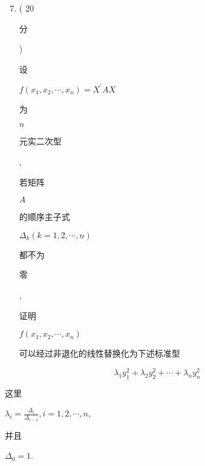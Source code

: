 \documentclass[10pt]{article}
\begin{document}
\begin{enumerate}
  \setcounter{enumi}{6}
  \item ( 20 \begin{CJK}{UTF8}{mj}分\end{CJK}) \begin{CJK}{UTF8}{mj}设\end{CJK} $f\left(x_{1}, x_{2}, \cdots, x_{n}\right)=X^{\prime} A X$ \begin{CJK}{UTF8}{mj}为\end{CJK} $n$ \begin{CJK}{UTF8}{mj}元实二次型\end{CJK}, \begin{CJK}{UTF8}{mj}若矩阵\end{CJK} $A$ \begin{CJK}{UTF8}{mj}的顺序主子式\end{CJK} $\Delta_{k}(k=1,2, \cdots, n)$ \begin{CJK}{UTF8}{mj}都不为\end{CJK} \begin{CJK}{UTF8}{mj}零\end{CJK}, \begin{CJK}{UTF8}{mj}证明\end{CJK} $f\left(x_{1}, x_{2}, \cdots, x_{n}\right)$ \begin{CJK}{UTF8}{mj}可以经过非退化的线性替换化为下述标准型\end{CJK}
\end{enumerate}
$$
\lambda_{1} y_{1}^{2}+\lambda_{2} y_{2}^{2}+\cdots+\lambda_{n} y_{n}^{2}
$$
\begin{CJK}{UTF8}{mj}这里\end{CJK} $\lambda_{i}=\frac{\Delta_{i}}{\Delta_{i-1}}, i=1,2, \cdots, n$, \begin{CJK}{UTF8}{mj}并且\end{CJK} $\Delta_{0}=1$.
\end{document}
